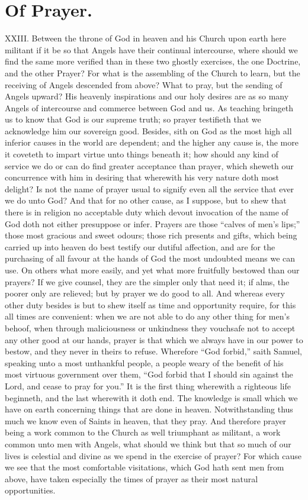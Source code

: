 \section*{Of Prayer.}
XXIII. Between the throne of God in heaven and his Church upon earth here militant if it be so that Angels have their continual intercourse, where should we find the same more verified than in these two ghostly exercises, the one Doctrine, and the other Prayer? For what is the assembling of the Church to learn, but the receiving of Angels descended from above? What to pray, but the sending of Angels upward? His heavenly inspirations and our holy desires are as so many Angels of intercourse and commerce between God and us. As teaching bringeth us to know that God is our supreme truth; so prayer testifieth that we acknowledge him our sovereign good.
Besides, sith on God as the most high all inferior causes in the world are dependent; and the higher any cause is, the more it coveteth to impart virtue unto things beneath it; how should any kind of service we do or can do find greater acceptance than prayer, which sheweth our concurrence with him in desiring that wherewith his very nature doth most delight?
Is not the name of prayer usual to signify even all the service that ever we do unto God? And that for no other cause,  as I suppose, but to shew that there is in religion no acceptable duty which devout invocation of the name of God doth not either presuppose or infer. Prayers are those “calves of men’s lips;” those most gracious and sweet odours; those rich presents and gifts, which being carried up into heaven do best testify our dutiful affection, and are for the purchasing of all favour at the hands of God the most undoubted means we can use.
On others what more easily, and yet what more fruitfully bestowed than our prayers? If we give counsel, they are the simpler only that need it; if alms, the poorer only are relieved; but by prayer we do good to all. And whereas every other duty besides is but to shew itself as time and opportunity require, for this all times are convenient: when we are not able to do any other thing for men’s behoof, when through maliciousness or unkindness they vouchsafe not to accept any other good at our hands, prayer is that which we always have in our power to bestow, and they never in theirs to refuse. Wherefore “God forbid,” saith Samuel, speaking unto a most unthankful people, a people weary of the benefit of his most virtuous government over them, “God forbid that I should sin against the Lord, and cease to pray for you.” It is the first thing wherewith a righteous life beginneth, and the last wherewith it doth end.
The knowledge is small which we have on earth concerning things that are done in heaven. Notwithstanding thus much we know even of Saints in heaven, that they pray. And therefore prayer being a work common to the Church as well triumphant as militant, a work common unto men with Angels, what should we think but that so much of our lives is celestial and divine as we spend in the exercise of prayer? For which cause we see that the most comfortable visitations, which God hath sent men from above, have taken especially the times of prayer as their most natural opportunities.


